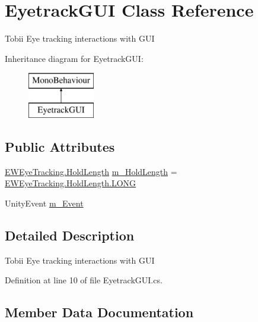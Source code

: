 \hypertarget{class_eyetrack_g_u_i}{}\section{Eyetrack\+G\+UI Class Reference}
\label{class_eyetrack_g_u_i}


Tobii Eye tracking interactions with G\+UI  


Inheritance diagram for Eyetrack\+G\+UI\+:\begin{figure}[H]
\begin{center}
\leavevmode
\includegraphics[height=2.000000cm]{class_eyetrack_g_u_i}
\end{center}
\end{figure}
\subsection*{Public Attributes}
\begin{DoxyCompactItemize}
\item 
\mbox{\hyperlink{class_e_w_eye_tracking_a47461bd1b91c6aacca31b57253249392}{E\+W\+Eye\+Tracking.\+Hold\+Length}} \mbox{\hyperlink{class_eyetrack_g_u_i_ab57dc65298441cee8f0018570e14addb}{m\+\_\+\+Hold\+Length}} = \mbox{\hyperlink{class_e_w_eye_tracking_a47461bd1b91c6aacca31b57253249392ac1fabfea54ec6011e694f211f3ffebf3}{E\+W\+Eye\+Tracking.\+Hold\+Length.\+L\+O\+NG}}
\item 
Unity\+Event \mbox{\hyperlink{class_eyetrack_g_u_i_a7e9c102f6c1c8018d06554e136813834}{m\+\_\+\+Event}}
\end{DoxyCompactItemize}


\subsection{Detailed Description}
Tobii Eye tracking interactions with G\+UI 



Definition at line 10 of file Eyetrack\+G\+U\+I.\+cs.



\subsection{Member Data Documentation}
\mbox{\label{class_eyetrack_g_u_i_a7e9c102f6c1c8018d06554e136813834}} 
